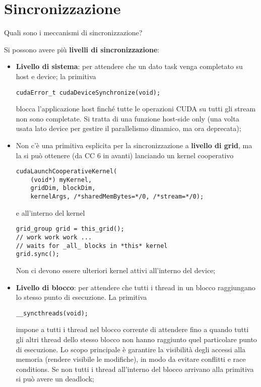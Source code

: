 \section{Sincronizzazione}

\begin{questions}
    \question Quali sono i meccanismi di sincronizzazione?
    
    \begin{solution}
        Si possono avere più \textbf{livelli di sincronizzazione}:
        \begin{itemize}
            \item \textbf{Livello di sistema}: per attendere che un dato task venga completato su host e device; la primitiva
            \begin{verbatim}
cudaError_t cudaDeviceSynchronize(void);
            \end{verbatim}
            blocca l'applicazione host finché tutte le operazioni CUDA su tutti gli stream non sono completate. Si tratta di una funzione host-side only (una volta usata lato device per gestire il parallelismo dinamico, ma ora deprecata);
            
            \item Non c'è una primitiva esplicita per la sincronizzazione a \textbf{livello di grid}, ma la si può ottenere (da CC 6 in avanti) lanciando un kernel cooperativo
            \begin{verbatim}
cudaLaunchCooperativeKernel(
    (void*) myKernel,
    gridDim, blockDim,
    kernelArgs, /*sharedMemBytes=*/0, /*stream=*/0);
            \end{verbatim}
            e all'interno del kernel
            \begin{verbatim}
grid_group grid = this_grid();
// work work work ...
// waits for _all_ blocks in *this* kernel
grid.sync();
            \end{verbatim}
            Non ci devono essere ulteriori kernel attivi all'interno del device;
            
            \item \textbf{Livello di blocco}: per attendere che tutti i thread in un blocco raggiungano lo stesso punto di esecuzione. La primitiva
            \begin{verbatim}
__syncthreads(void);
            \end{verbatim}
            impone a tutti i thread nel blocco corrente di attendere fino a quando tutti gli altri thread dello stesso blocco non hanno raggiunto quel particolare punto di esecuzione. Lo scopo principale è garantire la visibilità degli accessi alla memoria (rendere visibile le modifiche), in modo da evitare conflitti e race conditions. Se non tutti i thread all'interno del blocco arrivano alla primitiva si può avere un deadlock;
            

\end{itemize}
\end{solution}
\end{questions}
